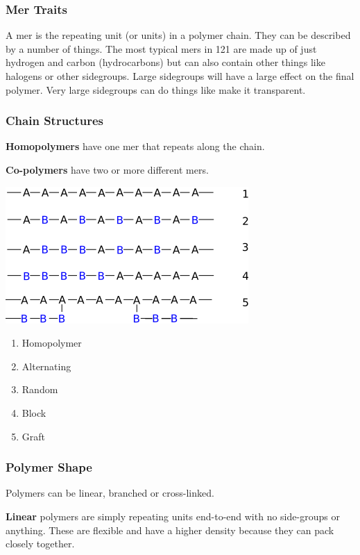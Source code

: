 \documentclass[12pt]{article}
\begin{document}
\subsubsection{Mer Traits}
A mer is the repeating unit (or units) in a polymer chain. 
They can be described by a number of things.
The most typical mers in 121 are made up of just hydrogen and carbon (hydrocarbons) but can also contain other things like halogens or other sidegroups.
Large sidegroups will have a large effect on the final polymer. 
Very large sidegroups can do things like make it transparent.

\subsubsection{Chain Structures}
\textbf{Homopolymers} have one mer that repeats along the chain.

\textbf{Co-polymers} have two or more different mers.


\begin{multicols}{2}
  \includegraphics[scale=0.5]{copolymers}
\begin{enumerate}
  \item Homopolymer
  \item Alternating 
  \item Random 
  \item Block 
  \item Graft
\end{enumerate}
\end{multicols}

\subsubsection{Polymer Shape}
Polymers can be linear, branched or cross-linked.

\textbf{Linear}
polymers are simply repeating units end-to-end with no side-groups or anything.
These are flexible and have a higher density because they can pack closely together.
\end{document}
